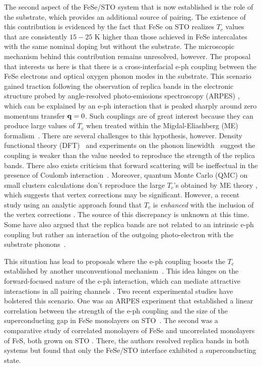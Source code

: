 \documentclass[%
 reprint,
 superscriptaddress,
nofootinbib,
nobibnotes,
 amsmath,amssymb,
 aps,
 prb,
 dvipsnames, 
 floatfix
]{revtex4-2}
\newcommand{\eph}{e-ph}
\begin{document}
The second aspect of the FeSe/STO system that is now established is the role of the substrate, which provides an additional source of pairing. The existence of this contribution is evidenced by the fact that FeSe on STO realizes $T_c$ values that are consistently $15-25$ K higher than those achieved in FeSe intercalates with the same nominal doping but without the substrate. The microscopic mechanism behind this contribution remains unresolved, however. The proposal that interests us here 
is that there is a cross-interfacial {\eph} coupling between the FeSe electrons and optical oxygen phonon modes in the substrate. This scenario gained traction following the observation of replica bands in the electronic structure probed by angle-resolved photo-emissions spectroscopy (ARPES) \cite{Lee2014}, which can be explained by an {\eph} interaction that is peaked sharply around zero momentum transfer ${\bf q} = 0$. Such couplings are of great interest because they can produce large values of $T_c$ when treated within the Migdal-Eliashberg (ME) formalism~\cite{PhysRevB.49.4395, Rademaker2016, WangSUST, Kulic2017}. 
There are several challenges to this hypothesis, however. Density functional theory (DFT)~\cite{Wang2016} and experiments on the phonon linewidth~\cite{Wang2017, Zhang2018} suggest the coupling is weaker than the value needed to reproduce the strength of the replica bands. There also exists criticism that forward scattering will be ineffectual in the presence of Coulomb interaction~\cite{ZhouMillis1, ZhouMillis2}. Moreover, quantum Monte Carlo (QMC) on small clusters calculations don't reproduce the large $T_c$'s obtained by ME theory \cite{XiXiang2019}, which suggests that vertex corrections may be significant. However, a recent study using an analytic approach found that $T_c$ is {\it enhanced} with the inclusion of the vertex corrections \cite{LiuPreprint}. The source of this discrepancy is unknown at this time. Some have also argued that the replica bands are not related to an intrinsic {\eph} coupling but rather an interaction of the outgoing photo-electron with the substrate phonons~\cite{PhysRevLett.120.237001}.

This situation has lead to proposals where the {\eph} coupling boosts the $T_c$ established by another unconventional mechanism~\cite{Lee2014, LI2016925, XiXiang2019, Bang2019}. This idea hinges on the forward-focused nature of the {\eph} interaction, which can mediate attractive interactions in all pairing channels \cite{VARELOGIANNIS20071125}. Two recent experimental studies have bolstered this scenario. One was an ARPES experiment that established a linear correlation between the strength of the {\eph} coupling and the size of the superconducting gap in FeSe monolayers on STO~\cite{Song:2019cg}. The second was a comparative study of correlated monolayers of FeSe and uncorrelated monolayers of FeS, both grown on STO \cite{Shigekawa24470}. There, the authors resolved replica bands in both systems but found that only the FeSe/STO interface exhibited a superconducting state. 
\end{document}
